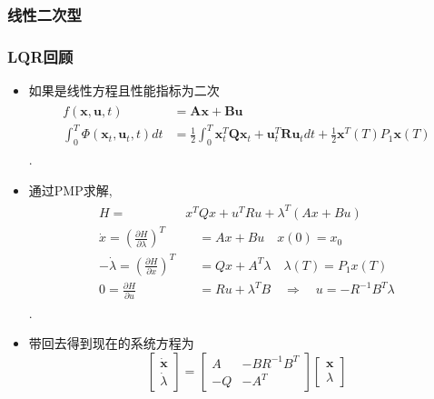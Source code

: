 \documentclass[UTF8, aspectratio=169, 9pt]{ctexbeamer}
\begin{document}
\subsubsection{线性二次型}
\begin{frame}
  \frametitle{LQR回顾}
  \begin{itemize}
  \item 如果是线性方程且性能指标为二次
    \begin{align}
      \begin{split}
        f( \boldsymbol{x}, \boldsymbol{u}, t ) &= \boldsymbol{A x} +
        \boldsymbol{B u} \\
        \int_0^T \Phi ( \boldsymbol{x}_t,  \boldsymbol{u}_t, t ) dt  &=
        \frac{1}{2} \int_0^T \boldsymbol{x}^T_t \boldsymbol{Q} \boldsymbol{x}_t
        + \boldsymbol{u}^T_t \boldsymbol{R} \boldsymbol{u}_t dt
        + \frac{1}{2} \boldsymbol{x}^{T}(T) P_{1} \boldsymbol{x}(T)
      \end{split}
    \end{align}.
  \item 通过PMP求解,
  \begin{align}
  \begin{split}
  H= & x^{T} Q x+u^{T} R u+\lambda^{T}(A x+B u) \\
  \dot{x}=\left(\frac{\partial H}{\partial \lambda}\right)^{T} & \quad=A x+B u \quad x(0)=x_{0} \\
  -\dot{\lambda}=\left(\frac{\partial H}{\partial x}\right)^{T} & \quad=Q x+A^{T} \lambda \quad \lambda(T)=P_{1} x(T) \\
  0=\frac{\partial H}{\partial u} & \quad=R u+\lambda^{T} B \quad \Rightarrow \quad u=-R^{-1} B^{T} \lambda
  \end{split}
  \end{align}.
  \item 带回去得到现在的系统方程为
  $$
  \left[\begin{array}{c}
    \dot{\boldsymbol{x}} \\
    \dot{\lambda}
    \end{array}\right]=\left[\begin{array}{cc}
    A & -B R^{-1} B^{T} \\
    -Q & -A^{T}
    \end{array}\right]\left[\begin{array}{c}
    \boldsymbol{x} \\
    \lambda
  \end{array}\right]
  $$
  \end{itemize}
\end{frame}
\end{document}
